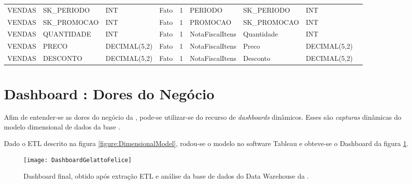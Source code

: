 \begin{landscape}
\begin{longtable}{l|l|l|l|l|l|l|l|l}
{\scriptsize{}VENDAS} & {\scriptsize{}SK\_PERIODO} & {\scriptsize{}INT} & {\scriptsize{}Fato} & {\scriptsize{}1} & {\scriptsize{}PERIODO} & {\scriptsize{}SK\_PERIODO} & {\scriptsize{}INT} & \tabularnewline
{\scriptsize{}VENDAS} & {\scriptsize{}SK\_PROMOCAO} & {\scriptsize{}INT} & {\scriptsize{}Fato} & {\scriptsize{}1} & {\scriptsize{}PROMOCAO} & {\scriptsize{}SK\_PROMOCAO} & {\scriptsize{}INT} & \tabularnewline
{\scriptsize{}VENDAS} & {\scriptsize{}QUANTIDADE} & {\scriptsize{}INT} & {\scriptsize{}Fato} & {\scriptsize{}1} & {\scriptsize{}NotaFiscalItens} & {\scriptsize{}Quantidade} & {\scriptsize{}INT} & \tabularnewline
{\scriptsize{}VENDAS} & {\scriptsize{}PRECO} & {\scriptsize{}DECIMAL(5,2)} & {\scriptsize{}Fato} & {\scriptsize{}1} & {\scriptsize{}NotaFiscalItens} & {\scriptsize{}Preco} & {\scriptsize{}DECIMAL(5,2)} & \tabularnewline
{\scriptsize{}VENDAS} & {\scriptsize{}DESCONTO} & {\scriptsize{}DECIMAL(5,2)} & {\scriptsize{}Fato} & {\scriptsize{}1} & {\scriptsize{}NotaFiscalItens} & {\scriptsize{}Desconto} & {\scriptsize{}DECIMAL(5,2)} & \tabularnewline
\hline 
\end{longtable}
\end{landscape}

\section{Dashboard \storeName{}: Dores do Negócio}

Afim de entender-se as dores do negócio da \emph{\storeName{}}, pode-se utilizar-se do recurso de \emph{dashboards} dinâmicos. Esses são \emph{capturas} dinâmicas do modelo dimensional de dados da base \emph{\databaseName{}}.

Dado o ETL descrito na figura \ref{figure:DimensionalModel}, rodou-se o modelo no software Tableau\texttrademark{}
e obteve-se o Dashboard da figura \ref{figure:BusinessDashboard}. 

\begin{center}
\begin{figure}[h]
\begin{centering}
\texttt{[image: DashboardGelattoFelice]}
\par\end{centering}
  \caption{\label{figure:BusinessDashboard}Dashboard final, obtido após extração ETL e análise da base de dados do Data Warehouse da \storeFullName{}.}
\end{figure}
\vspace*{-40pt}
\end{center}

